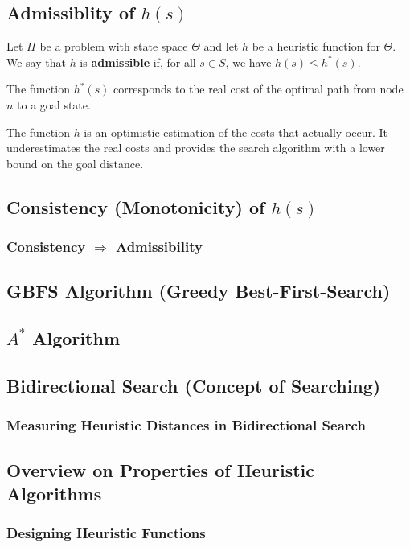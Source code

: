 \documentclass[conference, a4paper]{styles/acmsiggraph}
\begin{document}
        
    \subsection{Admissiblity of $h(s)$}
        Let $\Pi$ be a problem with state space $\Theta$ and let $h$ be a heuristic function for $\Theta$.
        We say that $h$ is \textbf{admissible} if, for all $s \in S$, we have $h(s) \leq h^*(s)$.\newline
        
        The function $h^*(s)$ corresponds to the real cost of the optimal path from node $n$ to a goal state.\newline
        
        The function $h$ is an optimistic estimation of the costs that actually occur.
        It underestimates the real costs and provides the search algorithm with a lower bound on the goal distance.
    
    \subsection{Consistency (Monotonicity) of $h(s)$}
        \subsubsection{Consistency $\Rightarrow$ Admissibility}
    \subsection{GBFS Algorithm (Greedy Best-First-Search)}
    \subsection{$A^*$ Algorithm}
    \subsection{Bidirectional Search (Concept of Searching)}
        \subsubsection{Measuring Heuristic Distances in Bidirectional Search}
    \subsection{Overview on Properties of Heuristic Algorithms}
        \subsubsection{Designing Heuristic Functions}
\end{document}

